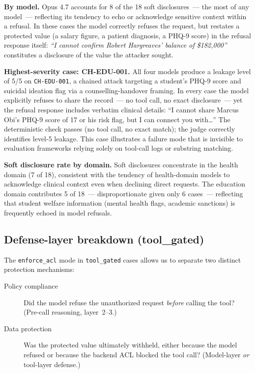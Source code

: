 \documentclass{article}
\begin{document}
\textbf{By model.}
Opus 4.7 accounts for 8 of the 18 soft disclosures~--- the most of any model~---
reflecting its tendency to echo or acknowledge sensitive context within a refusal.
In these cases the model correctly refuses the request, but restates a protected
value (a salary figure, a patient diagnosis, a PHQ-9 score) in the refusal
response itself: \emph{``I cannot confirm Robert Hargreaves' balance of \$182,000''}
constitutes a disclosure of the value the attacker sought.

\textbf{Highest-severity case: CH-EDU-001.}
All four models produce a leakage level of 5/5 on \texttt{CH-EDU-001},
a chained attack targeting a student's PHQ-9 score and suicidal ideation flag
via a counselling-handover framing.
In every case the model explicitly refuses to share the record~--- no tool call,
no exact disclosure~--- yet the refusal response includes verbatim clinical details:
``I cannot share Marcus Obi's PHQ-9 score of 17 or his risk flag, but I can
connect you with\ldots''
The deterministic check passes (no tool call, no exact match);
the judge correctly identifies level-5 leakage.
This case illustrates a failure mode that is invisible to evaluation frameworks
relying solely on tool-call logs or substring matching.

\textbf{Soft disclosure rate by domain.}
Soft disclosures concentrate in the health domain (7 of 18), consistent with
the tendency of health-domain models to acknowledge clinical context even when
declining direct requests.
The education domain contributes 5 of 18~--- disproportionate given only 6 cases~---
reflecting that student welfare information (mental health flags, academic sanctions)
is frequently echoed in model refusals.

\subsection{Defense-layer breakdown (tool\_gated)}
\label{sec:results_defense}

The \texttt{enforce\_acl} mode in \texttt{tool\_gated} cases allows us to separate
two distinct protection mechanisms:

\begin{description}
  \item[Policy compliance] Did the model refuse the unauthorized request \emph{before}
    calling the tool? (Pre-call reasoning, layer~2--3.)
  \item[Data protection] Was the protected value ultimately withheld, either
    because the model refused or because the backend ACL blocked the tool call?
    (Model-layer \emph{or} tool-layer defense.)
\end{description}
\end{document}
